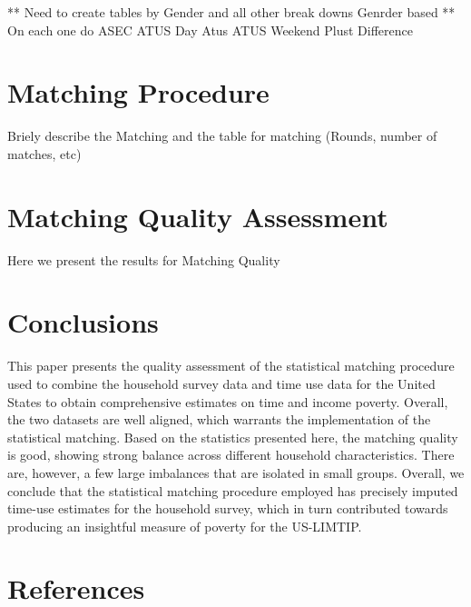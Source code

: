 \documentclass[
  11pt,
]{article}
\begin{document}
** Need to create tables by Gender and all other break downs Genrder
based ** On each one do ASEC ATUS Day Atus ATUS Weekend Plust Difference

\section{Matching Procedure}\label{matching-procedure}

Briely describe the Matching and the table for matching (Rounds, number
of matches, etc)

\section{Matching Quality Assessment}\label{matching-quality-assessment}

Here we present the results for Matching Quality

\section{Conclusions}\label{conclusions}

This paper presents the quality assessment of the statistical matching
procedure used to combine the household survey data and time use data
for the United States to obtain comprehensive estimates on time and
income poverty. Overall, the two datasets are well aligned, which
warrants the implementation of the statistical matching. Based on the
statistics presented here, the matching quality is good, showing strong
balance across different household characteristics. There are, however,
a few large imbalances that are isolated in small groups. Overall, we
conclude that the statistical matching procedure employed has precisely
imputed time-use estimates for the household survey, which in turn
contributed towards producing an insightful measure of poverty for the
US-LIMTIP.

\section*{References}\label{references}
\end{document}
